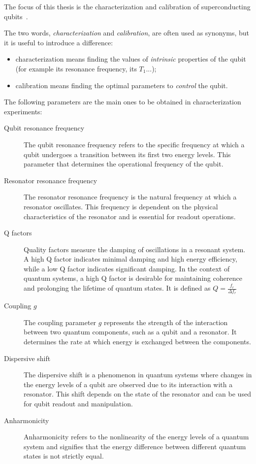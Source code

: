 
The focus of this thesis is the characterization and calibration of superconducting qubits~\cite{Roth2021}.

The two words, \textit{characterization} and \textit{calibration}, are often used as synonyms, but it is useful to introduce a difference:
\begin{itemize}
    \item characterization means finding the values of \textit{intrinsic} properties of the qubit (for example its resonance frequency, its $T_1$...);
    \item calibration means finding the optimal parameters to \textit{control} the qubit.
\end{itemize}

The following parameters are the main ones to be obtained in characterization experiments:
\begin{description}
    \item[Qubit resonance frequency] The qubit resonance frequency refers to the specific frequency at which a qubit undergoes a transition between its first two energy levels. This parameter that determines the operational frequency of the qubit.
    \item[Resonator resonance frequency] The resonator resonance frequency is the natural frequency at which a resonator oscillates. This frequency is dependent on the physical characteristics of the resonator and is essential for readout operations.
    \item[Q factors] Quality factors measure the damping of oscillations in a resonant system. A high Q factor indicates minimal damping and high energy efficiency, while a low Q factor indicates significant damping. In the context of quantum systems, a high Q factor is desirable for maintaining coherence and prolonging the lifetime of quantum states. It is defined as $Q = \frac{f_r}{\Delta f_r}$
    \item[Coupling $g$ ] The coupling parameter $g$ represents the strength of the interaction between two quantum components, such as a qubit and a resonator. It determines the rate at which energy is exchanged between the components.
    \item[Dispersive shift] The dispersive shift is a phenomenon in quantum systems where changes in the energy levels of a qubit are observed due to its interaction with a resonator. This shift depends on the state of the resonator and can be used for qubit readout and manipulation.
    \item[Anharmonicity] Anharmonicity refers to the nonlinearity of the energy levels of a quantum system and signifies that the energy difference between different quantum states is not strictly equal.

\end{description}
